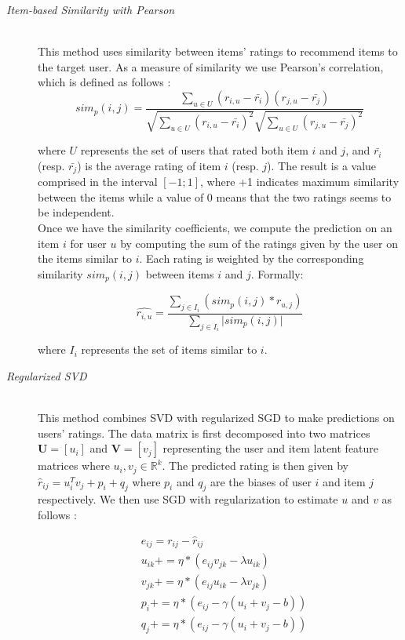 \documentclass[10pt,conference,compsocconf]{IEEEtran}
\begin{document}
\begin{description}

\item[\emph{Item-based Similarity with Pearson}]\ \\
This method uses similarity between items' ratings to recommend items to the target user. As a measure of similarity we use Pearson's correlation, which is defined \cite{Sarwar:2001:ICF:371920.372071} as follows :
$$
sim_p(i, j) = \frac{\sum_{u \in U} (r_{i,u} - \bar{r_i})(r_{j,u} - \bar{r_j})}{\sqrt{\sum_{u \in U} (r_{i,u} - \bar{r_i})^2}	\sqrt{\sum_{u \in U} (r_{j,u} - \bar{r_j})^2}}
$$

where $U$ represents the set of users that rated both item $i$ and $j$, and $\bar{r_i}$ (resp. $\bar{r_j}$) is the average rating of item $i$ (resp. $j$). The result is a value comprised in the interval $[-1;1]$, where +1 indicates maximum similarity between the items while a value of 0 means that the two ratings seems to be independent. \\
Once we have the similarity coefficients, we compute the prediction on an item $i$ for user $u$ by computing the sum of the ratings given by the user on the items similar to $i$. Each rating is weighted by the corresponding similarity $sim_p(i, j)$ between items $i$ and $j$. Formally:

$$
\hat{r_{i,u}} = \frac{\sum_{j \in I_i} (sim_p(i, j) \ast r_{u,j} )}{\sum_{j \in I_i} \vert sim_p(i, j) \vert}
$$ 

where $I_i$ represents the set of items similar to $i$.


\vspace{2mm}
\item[\emph{Regularized SVD}]\  \\ 
This method combines SVD with regularized SGD to make predictions on users' ratings. The data matrix is first decomposed into two matrices $\textbf{U} = \left[ u_i \right]$ and $\textbf{V} = \left[ v_j \right]$ representing the user and item latent feature matrices where $u_i,v_j \in \mathbb{R}^k$. The predicted rating is then given by $\hat{r}_{ij} = u_i^Tv_j + p_i + q_j$ where $p_i$ and $q_j$ are the biases of user $i$ and item $j$ respectively. We then use SGD with regularization \cite{paterek} to estimate $u$ and $v$ as follows :

$$
\begin{aligned}
& e_{ij} = r_{ij} - \hat{r}_{ij} \\
& u_{ik} += \eta \ast (e_{ij}v_{jk} - \lambda u_{ik}) \\
& v_{jk} += \eta \ast (e_{ij}u_{ik} - \lambda v_{jk}) \\
& p_{i} += \eta  \ast (e_{ij} - \gamma (u_i + v_j - b)) \\
& q_{j} += \eta  \ast (e_{ij} - \gamma (u_i + v_j - b))
\end{aligned}
$$


\end{description}
\end{document}
